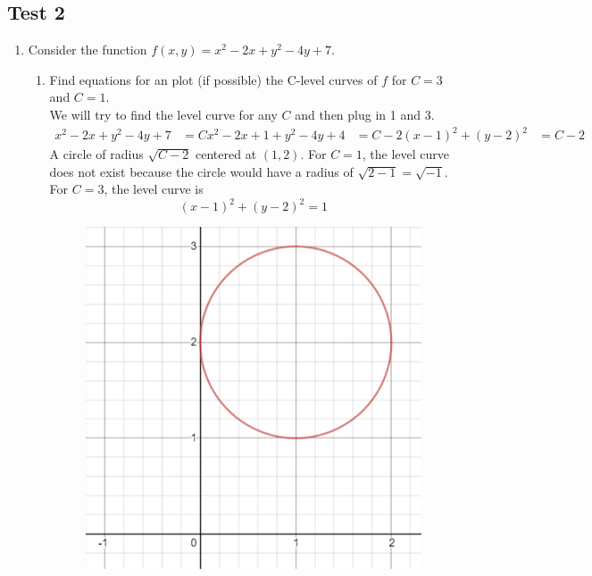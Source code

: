 \subsection{Test 2}
\begin{enumerate}
	\item Consider the function $f(x,y) = x^2 - 2x + y^2 - 4y + 7$.\\
	\begin{enumerate}[label=\alph*.]
		\item Find equations for an plot (if possible) the C-level curves of $f$ for $C = 3$ and $C = 1$.\\
		We will try to find the level curve for any $C$ and then plug in 1 and 3.
		\begin{align*}
			x^2 - 2x + y^2 - 4y + 7 &= C
			x^2 - 2x + 1 + y^2 - 4y + 4 &= C-2
			(x-1)^2 + (y-2)^2 &= C-2			
		\end{align*}
		A circle of radius $\sqrt{C-2}$ centered at $(1,2)$.
		For $C = 1$, the level curve does not exist because the circle would have a radius of $\sqrt{2-1} = \sqrt{-1}$.
		For $C = 3$, the level curve is 
		\begin{equation*}
			(x-1)^2 + (y-2)^2 = 1	
		\end{equation*}
		
		\begin{figure}[h]
			\centering
			\includegraphics[scale=.25]{Images/additionalMaterials/test2_circle}
		\end{figure}
		

\end{enumerate}
\end{enumerate}
